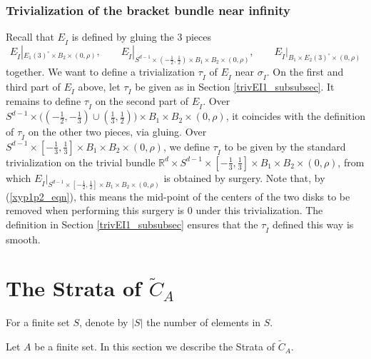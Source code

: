 \documentclass[11pt]{article}
\theoremstyle{definition}
\theoremstyle{remark}
\def\wt#1{\widetilde{#1}}
\def\R{\mathbb{R}}
\def\rI{{\mathring{I}}}
\begin{document}
\subsubsection{Trivialization of the bracket bundle near infinity}

Recall that $E_\rI$ is defined by gluing the 3 pieces
$$E_\rI|_{E_1(3)^\circ\times B_2\times(0,\rho)},\qquad E_\rI|_{S^{d-1}\times(-\frac{1}{2},\frac{1}{2})\times B_1\times B_2\times (0,\rho)},\qquad E_\rI|_{B_1\times E_2(3)^\circ\times(0,\rho)}$$
together. 
We want to define a trivialization $\tau_\rI$ of $E_\rI$ near $\sigma_\rI$.
On the first and third part of $E_\rI$ above, let $\tau_\rI$ be given as in Section \ref{trivEI1_subsubsec}. 
It remains to define $\tau_\rI$ on the second part of $E_\rI$. 
Over $S^{d-1}\times\big((-\frac{1}{2},-\frac{1}{3})\cup(\frac{1}{3},\frac{1}{2})\big)\times B_1\times B_2\times (0,\rho)$, it coincides with the definition of $\tau_\rI$ on the other two pieces, via gluing. 
Over $S^{d-1}\times[-\frac{1}{3},\frac{1}{3}]\times B_1\times B_2\times (0,\rho)$, 
we define $\tau_\rI$ to be given by the standard trivialization on the trivial bundle $\R^d\times S^{d-1}\times[-\frac{1}{3},\frac{1}{3}]\times B_1\times B_2\times (0,\rho)$, from which $E_\rI|_{S^{d-1}\times[-\frac{1}{2},\frac{1}{2}]\times B_1\times B_2\times (0,\rho)}$ is obtained by surgery. 
Note that, by (\ref{xyp1p2_eqn}), this means the mid-point of the centers of the two disks to be removed when performing this surgery is 0 under this trivialization. 
The definition in Section \ref{trivEI1_subsubsec} ensures that the $\tau_\rI$ defined this way is smooth. 

\section{The Strata of  \texorpdfstring{$\wt{C}_A$}{the big configuration space}}

For a finite set $S$, denote by $|S|$ the number of elements in $S$. 

Let $A$ be a finite set. 
In this section we describe the Strata of $\wt{C}_A$. 
\end{document}
